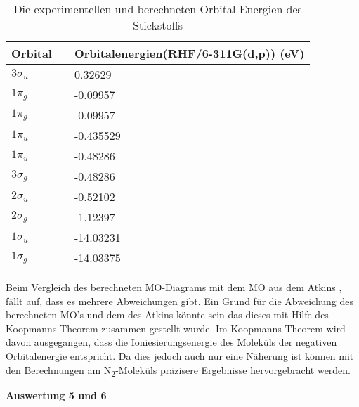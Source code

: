 \documentclass[12pt]{article}
\begin{document}
\begin{onehalfspace}
\begin{table}[!htpb]
\centering
\caption{Die experimentellen und berechneten Orbital Energien des Stickstoffs}
\begin{tabular}{lll}
\toprule
Orbital  && Orbitalenergien(RHF/6-311G(d,p)) (eV)\\
\midrule
$3\sigma _u$ & &   0.32629\\
$1\pi _g$    & &    -0.09957 \\
$1\pi _g$    & &   -0.09957 \\
$1\pi _u$    &  &  -0.435529 \\
$1\pi _u$    & &  -0.48286 \\
$3\sigma _g$ &  & -0.48286 \\
$2\sigma _u$ && -0.52102 \\
$2\sigma _g$ & & -1.12397 \\
$1\sigma _u$ &  &-14.03231 \\
$1\sigma _g$ & &-14.03375 \\
\bottomrule
\end{tabular}
\end{table}


Beim Vergleich des berechneten MO-Diagrams mit dem MO aus dem Atkins \supercite{atkins}, fällt auf, dass es mehrere Abweichungen gibt. Ein Grund für die Abweichung des berechneten MO's und dem des Atkins könnte sein das dieses mit Hilfe des Koopmanns-Theorem zusammen gestellt wurde. Im Koopmanns-Theorem wird davon ausgegangen, dass die Ioniesierungsenergie des Moleküls der negativen Orbitalenergie entspricht. Da dies jedoch auch nur eine Näherung ist können mit den Berechnungen am N\textsubscript{2}-Moleküls präzisere Ergebnisse hervorgebracht werden.  

\textbf{Auswertung 5 und 6}
\begin{figure}[!hptb]
    \centering
    \begin{subfigure}[b]{0.4\textwidth}
    \end{subfigure}
    \begin{subfigure}[b]{0.4\textwidth}
    \end{subfigure}

\end{figure}



\begin{figure}[!hptb]
    \centering
    \begin{subfigure}[b]{0.4\textwidth}
    \end{subfigure}
    ~ %
    \begin{subfigure}[b]{0.4\textwidth}
    \end{subfigure}


\end{figure}
\end{onehalfspace}
\end{document}
